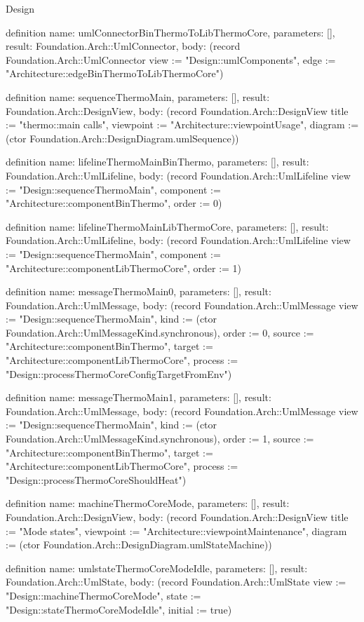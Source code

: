 \begin{lexlean}{Design}
\begin{semanticmodule}
definition{
  name: umlConnectorBinThermoToLibThermoCore,
  parameters: [],
  result: Foundation.Arch::UmlConnector,
  body: (record Foundation.Arch::UmlConnector {view := "Design::umlComponents", edge := "Architecture::edgeBinThermoToLibThermoCore"})
}

definition{
  name: sequenceThermoMain,
  parameters: [],
  result: Foundation.Arch::DesignView,
  body: (record Foundation.Arch::DesignView {title := "thermo::main calls", viewpoint := "Architecture::viewpointUsage", diagram := (ctor Foundation.Arch::DesignDiagram.umlSequence)})
}

definition{
  name: lifelineThermoMainBinThermo,
  parameters: [],
  result: Foundation.Arch::UmlLifeline,
  body: (record Foundation.Arch::UmlLifeline {view := "Design::sequenceThermoMain", component := "Architecture::componentBinThermo", order := 0})
}

definition{
  name: lifelineThermoMainLibThermoCore,
  parameters: [],
  result: Foundation.Arch::UmlLifeline,
  body: (record Foundation.Arch::UmlLifeline {view := "Design::sequenceThermoMain", component := "Architecture::componentLibThermoCore", order := 1})
}

definition{
  name: messageThermoMain0,
  parameters: [],
  result: Foundation.Arch::UmlMessage,
  body: (record Foundation.Arch::UmlMessage {view := "Design::sequenceThermoMain", kind := (ctor Foundation.Arch::UmlMessageKind.synchronous), order := 0, source := "Architecture::componentBinThermo", target := "Architecture::componentLibThermoCore", process := "Design::processThermoCoreConfigTargetFromEnv"})
}

definition{
  name: messageThermoMain1,
  parameters: [],
  result: Foundation.Arch::UmlMessage,
  body: (record Foundation.Arch::UmlMessage {view := "Design::sequenceThermoMain", kind := (ctor Foundation.Arch::UmlMessageKind.synchronous), order := 1, source := "Architecture::componentBinThermo", target := "Architecture::componentLibThermoCore", process := "Design::processThermoCoreShouldHeat"})
}

definition{
  name: machineThermoCoreMode,
  parameters: [],
  result: Foundation.Arch::DesignView,
  body: (record Foundation.Arch::DesignView {title := "Mode states", viewpoint := "Architecture::viewpointMaintenance", diagram := (ctor Foundation.Arch::DesignDiagram.umlStateMachine)})
}

definition{
  name: umlstateThermoCoreModeIdle,
  parameters: [],
  result: Foundation.Arch::UmlState,
  body: (record Foundation.Arch::UmlState {view := "Design::machineThermoCoreMode", state := "Design::stateThermoCoreModeIdle", initial := true})
}


\end{semanticmodule}
\end{lexlean}
